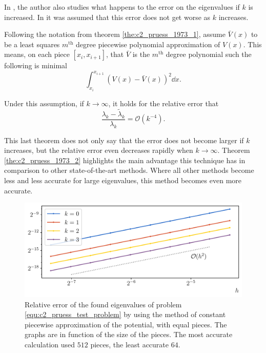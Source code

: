 In \cite{pruess_estimating_1973}, the author also studies what happens to the error on the eigenvalues if $k$ is increased. In \cite{canosa_new_1970} it was assumed that this error does not get worse as $k$ increases.

\begin{theorem}[Pruess 1973]\label{the:c2_pruess_1973_2}
    Following the notation from theorem \ref{the:c2_pruess_1973_1}, assume $\bar{V}(x)$ to be a least squares $m^\text{th}$ degree piecewise polynomial approximation of $V(x)$. This means, on each piece $[x_i, x_{i+1}]$, that $\bar{V}$ is the $m^\text{th}$ degree polynomial such the following is minimal
    $$
        \int_{x_i}^{x_{i+1}} \left(V(x) - \bar{V}(x)\right)^2 \dd x \text{.}
    $$

    Under this assumption, if $k \to \infty$, it holds for the relative error that
    $$
        \frac{\lambda_k - \tilde{\lambda}_k}{\lambda_k} = \mathcal{O}(k^{-4})\text{.}
    $$
\end{theorem}

This last theorem does not only say that the error does not become larger if $k$ increases, but the relative error even decreases rapidly when $k \to \infty$. Theorem \ref{the:c2_pruess_1973_2} highlights the main advantage this technique has in comparison to other state-of-the-art methods. Where all other methods become less and less accurate for large eigenvalues, this method becomes even more accurate.

\begin{figure}
    \begin{center}
        \includegraphics[width=\textwidth]{img/chapter2/pruess_h_error.pdf}
    \end{center}
    \caption{Relative error of the found eigenvalues of problem \eqref{equ:c2_pruess_test_problem} by using the method of constant piecewise approximation of the potential, with equal pieces. The graphs are in function of the size of the pieces. The most accurate calculation used $512$ pieces, the least accurate $64$.}
    \label{fig:c2_pruess_h_error}
\end{figure}

